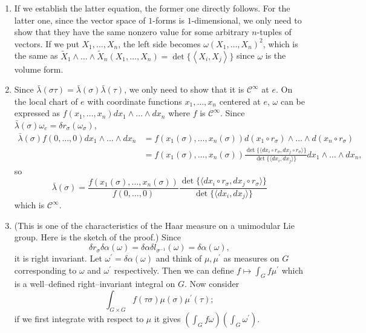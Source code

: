 \begin{enumerate}
For the 2nd identity, interchange $f$ and $g$ and subtract from the former one.
\item If we establish the latter equation, the former one directly follows. 
For the latter one, since the vector space of $1$-forms is $1$-dimensional, 
we only need to show that they have the same nonzero value for some arbitrary $n$-tuples of vectors. 
If we put $X_{1}, \ldots, X_{n}$, the left side becomes $\omega(X_{1}, \ldots, X_{n})^{2}$, 
which is the same as $\tilde{X}_{1} \wedge \ldots \wedge \tilde{X}_{n}(X_{1}, \ldots, X_{n})
=\det\{\left\langle X_{i}, X_{j}\right\rangle\}$ since $\omega$ is the volume form.
\item Since $\bar{\lambda}(\sigma \tau)=\bar{\lambda}(\sigma) \bar{\lambda}(\tau)$, we only need to show that it is $\mathcal{C}^{\infty}$ at $e$. 
On the local chart of $e$ with coordinate functions $x_{1}, \ldots, x_{n}$ centered at $e$, 
$\omega$ can be expressed as $f(x_{1}, \ldots, x_{n}) d x_{1} \wedge \ldots \wedge d x_{n}$ where $f$ is $\mathcal{C}^{\infty}$. 
Since $\bar{\lambda}(\sigma) \omega_{e}=\delta r_{\sigma}(\omega_{\sigma})$,
\begin{align*}
\bar{\lambda}(\sigma) f(0, \ldots, 0) d x_{1} \wedge \ldots \wedge d x_{n}
&=f(x_{1}(\sigma), \ldots, x_{n}(\sigma)) d(x_{1} \circ r_{\sigma}) \wedge \ldots \wedge d(x_{n} \circ r_{\sigma})\\
&=f(x_{1}(\sigma), \ldots, x_{n}(\sigma)) \frac{\det\{\langle d x_{i} \circ r_{\sigma}, d x_{j} \circ r_{\sigma}\rangle\}}{\det\{\langle d x_{i}, d x_{j}\rangle\}} d x_{1} \wedge \ldots \wedge d x_{n},
\end{align*}
so
\[\bar{\lambda}(\sigma)=\frac{f(x_{1}(\sigma), \ldots, x_{n}(\sigma))}{f(0, \ldots, 0)} \frac{\det\{\langle d x_{i} \circ r_{\sigma}, d x_{j} \circ r_{\sigma}\rangle\}}{\det\{\langle d x_{i}, d x_{j}\rangle\}}\]
which is $\mathcal{C}^{\infty}$.
\item (This is one of the characteristics of the Haar measure on a unimodular Lie group. Here is the sketch of the proof.) Since
\[\delta r_{\sigma} \delta \alpha(\omega)=\delta \alpha \delta l_{\sigma^{-1}}(\omega)=\delta \alpha(\omega),\]
it is right invariant. Let $\omega^{\prime}=\delta \alpha(\omega)$ and think of $\mu, \mu^{\prime}$ as measures on $G$ corresponding to $\omega$ and $\omega^{\prime}$ respectively. 
Then we can define $f \mapsto \int_{G} f \mu^{\prime}$ 
which is a well--defined right--invariant integral on $G$. Now consider
\[\int_{G \times G} f(\tau \sigma) \mu(\sigma) \mu^{\prime}(\tau);\]
if we first integrate with respect to $\mu$ it gives $\left(\int_{G} f \omega\right)\left(\int_{G} \omega^{\prime}\right)$. 

\end{enumerate}
